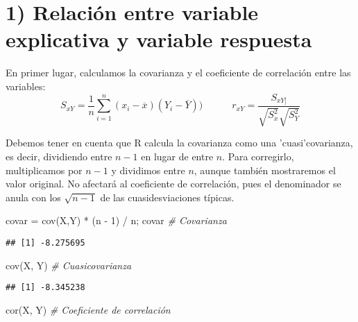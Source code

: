 \documentclass[
]{article}
\newenvironment{Shaded}{\begin{snugshade}}{\end{snugshade}}
\newcommand{\CommentTok}[1]{\textcolor[rgb]{0.56,0.35,0.01}{\textit{#1}}}
\newcommand{\DecValTok}[1]{\textcolor[rgb]{0.00,0.00,0.81}{#1}}
\newcommand{\FunctionTok}[1]{\textcolor[rgb]{0.00,0.00,0.00}{#1}}
\newcommand{\NormalTok}[1]{#1}
\newcommand{\OtherTok}[1]{\textcolor[rgb]{0.56,0.35,0.01}{#1}}
\newcommand{\SpecialCharTok}[1]{\textcolor[rgb]{0.00,0.00,0.00}{#1}}
\begin{document}
\hypertarget{relaciuxf3n-entre-variable-explicativa-y-variable-respuesta}{%
\section{1) Relación entre variable explicativa y variable
respuesta}\label{relaciuxf3n-entre-variable-explicativa-y-variable-respuesta}}

En primer lugar, calculamos la covarianza y el coeficiente de
correlación entre las variables: \[
S_{xY}=\frac{1}{n}\sum_{i=1}^n (x_i-\overline{x})(Y_i-\overline{Y}))\quad\quad\quad 
r_{xY}=\frac{S_{xY]}}{\sqrt{S_x^2}\sqrt{S_Y^2}}
\]

Debemos tener en cuenta que R calcula la covarianza como una
'cuasi'covarianza, es decir, dividiendo entre \(n-1\) en lugar de entre
\(n\). Para corregirlo, multiplicamos por \(n-1\) y dividimos entre
\(n\), aunque también mostraremos el valor original. No afectará al
coeficiente de correlación, pues el denominador se anula con los
\(\sqrt{n-1}\) de las cuasidesviaciones típicas.

\begin{Shaded}
\begin{Highlighting}[]
\NormalTok{covar }\OtherTok{=} \FunctionTok{cov}\NormalTok{(X,Y) }\SpecialCharTok{*}\NormalTok{ (n }\SpecialCharTok{{-}} \DecValTok{1}\NormalTok{) }\SpecialCharTok{/}\NormalTok{ n; covar     }\CommentTok{\# Covarianza}
\end{Highlighting}
\end{Shaded}

\begin{verbatim}
## [1] -8.275695
\end{verbatim}

\begin{Shaded}
\begin{Highlighting}[]
\FunctionTok{cov}\NormalTok{(X, Y)                                 }\CommentTok{\# Cuasicovarianza}
\end{Highlighting}
\end{Shaded}

\begin{verbatim}
## [1] -8.345238
\end{verbatim}

\begin{Shaded}
\begin{Highlighting}[]
\FunctionTok{cor}\NormalTok{(X, Y)                                 }\CommentTok{\# Coeficiente de correlación}
\end{Highlighting}
\end{Shaded}
\end{document}
